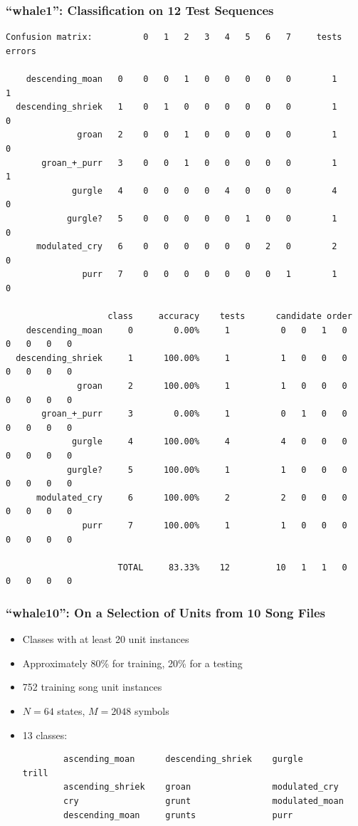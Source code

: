 \documentclass{beamer}
\begin{document}
\begin{frame}[fragile]
    \frametitle{``whale1'': Classification on 12 Test Sequences}

    \tiny{
    \begin{verbatim}
Confusion matrix:          0   1   2   3   4   5   6   7     tests   errors

    descending_moan   0    0   0   1   0   0   0   0   0        1       1
  descending_shriek   1    0   1   0   0   0   0   0   0        1       0
              groan   2    0   0   1   0   0   0   0   0        1       0
       groan_+_purr   3    0   0   1   0   0   0   0   0        1       1
             gurgle   4    0   0   0   0   4   0   0   0        4       0
            gurgle?   5    0   0   0   0   0   1   0   0        1       0
      modulated_cry   6    0   0   0   0   0   0   2   0        2       0
               purr   7    0   0   0   0   0   0   0   1        1       0

                    class     accuracy    tests      candidate order
    descending_moan     0        0.00%     1          0   0   1   0   0   0   0   0
  descending_shriek     1      100.00%     1          1   0   0   0   0   0   0   0
              groan     2      100.00%     1          1   0   0   0   0   0   0   0
       groan_+_purr     3        0.00%     1          0   1   0   0   0   0   0   0
             gurgle     4      100.00%     4          4   0   0   0   0   0   0   0
            gurgle?     5      100.00%     1          1   0   0   0   0   0   0   0
      modulated_cry     6      100.00%     2          2   0   0   0   0   0   0   0
               purr     7      100.00%     1          1   0   0   0   0   0   0   0

                      TOTAL     83.33%    12         10   1   1   0   0   0   0   0
    \end{verbatim}
    }

\end{frame}




\begin{frame}[fragile]
\frametitle{``whale10'': On a Selection of Units from 10 Song Files}

\begin{itemize}
    \item Classes with at least 20 unit instances
    \item Approximately 80\% for training, 20\% for a testing
    \item 752 training song unit instances
    \item $N = 64$ states, $M = 2048$ symbols
    \item 13 classes:
        \tiny{
        \begin{verbatim}
        ascending_moan      descending_shriek    gurgle            trill
        ascending_shriek    groan                modulated_cry
        cry                 grunt                modulated_moan
        descending_moan     grunts               purr
        \end{verbatim}
        }
\end{itemize}

\end{frame}
\end{document}
